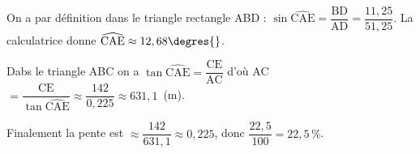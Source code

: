 \begin{enumerate}
%	
%	
%	
On a par définition dans le triangle rectangle ABD : $\sin \widehat{\text{CAE}} = \dfrac{\text{BD}}{\text{AD}} = \dfrac{11,25}{51,25}$. La calculatrice donne $\widehat{\text{CAE}} \approx 12,68\degres{}$.

Dabs le triangle ABC on a $\tan \widehat{\text{CAE}} = \dfrac{\text{CE}}{\text{AC}}$ d'où AC $ = \dfrac{\text{CE}}{\tan \widehat{\text{CAE}}} \approx \dfrac{142}{0,225} \approx 631,1$~(m).

Finalement la pente  est  $\approx \dfrac{142}{631,1} \approx 0,225$, donc $\dfrac{22,5}{100} = 22,5\,\%$. 
\end{enumerate}

\vspace{0,5cm}

